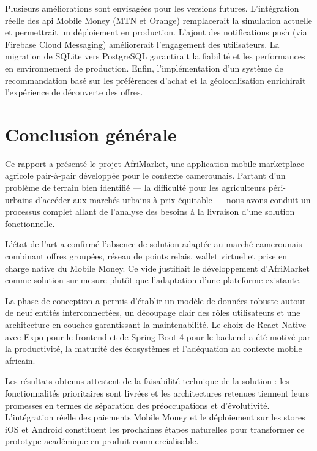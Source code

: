 \documentclass[12pt, a4paper, oneside]{report}
\begin{document}
Plusieurs améliorations sont envisagées pour les versions futures. L'intégration réelle
des \gls{api} Mobile Money (MTN et Orange) remplacerait la simulation actuelle et
permettrait un déploiement en production. L'ajout des notifications push (via Firebase
Cloud Messaging) améliorerait l'engagement des utilisateurs. La migration de SQLite vers
PostgreSQL garantirait la fiabilité et les performances en environnement de production.
Enfin, l'implémentation d'un système de recommandation basé sur les préférences d'achat
et la géolocalisation enrichirait l'expérience de découverte des offres.

\chapter*{Conclusion générale}

Ce rapport a présenté le projet AfriMarket, une application mobile marketplace agricole
pair-à-pair développée pour le contexte camerounais. Partant d'un problème de terrain bien
identifié — la difficulté pour les agriculteurs péri-urbains d'accéder aux marchés urbains
à prix équitable — nous avons conduit un processus complet allant de l'analyse des besoins
à la livraison d'une solution fonctionnelle.

L'état de l'art a confirmé l'absence de solution adaptée au marché camerounais combinant
offres groupées, réseau de points relais, wallet virtuel et prise en charge native du
Mobile Money. Ce vide justifiait le développement d'AfriMarket comme solution sur mesure
plutôt que l'adaptation d'une plateforme existante.

La phase de conception a permis d'établir un modèle de données robuste autour de neuf
entités interconnectées, un découpage clair des rôles utilisateurs et une architecture en
couches garantissant la maintenabilité. Le choix de React Native avec Expo pour le
frontend et de Spring Boot 4 pour le backend a été motivé par la productivité, la
maturité des écosystèmes et l'adéquation au contexte mobile africain.

Les résultats obtenus attestent de la faisabilité technique de la solution : les
fonctionnalités prioritaires sont livrées et les architectures retenues tiennent leurs
promesses en termes de séparation des préoccupations et d'évolutivité. L'intégration
réelle des paiements Mobile Money et le déploiement sur les stores iOS et Android
constituent les prochaines étapes naturelles pour transformer ce prototype académique en
produit commercialisable.
\end{document}
